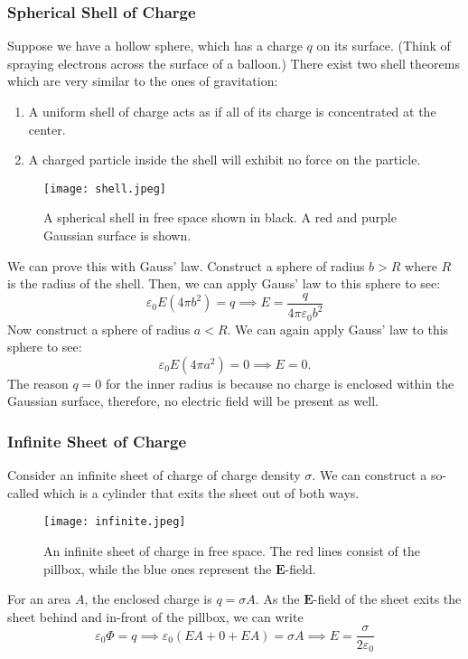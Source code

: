 \documentclass[12pt]{article}
\let\vec\mathbf
\begin{document}
  \subsubsection{Spherical Shell of Charge}
  Suppose we have a hollow sphere, which has a charge $q$ on its surface. (Think of spraying electrons across the surface of a balloon.) There exist two shell theorems which are very similar to the ones of gravitation:
  \begin{enumerate}
      \item A uniform shell of charge acts as if all of its charge is concentrated at the center.
      \item A charged particle inside the shell will exhibit no force on the particle. 
  \end{enumerate}
  \begin{figure}[H]
  \centering
      \texttt{[image: shell.jpeg]}
      \caption{A spherical shell in free space shown in black. A red and purple Gaussian surface is shown. }
  \end{figure}
  We can prove this with Gauss' law. Construct a sphere of radius $b > R$ where $R$ is the radius of the shell. Then, we can apply Gauss' law to this sphere to see:
  \[\varepsilon_0 E(4\pi b^2) = q\implies E = \frac{q}{4\pi \varepsilon_0 b^2}\]
  Now construct a sphere of radius $a < R$. We can again apply Gauss' law to this sphere to see:
  \[\varepsilon_0 E(4\pi a^2) = 0\implies E = 0.\]
  The reason $q = 0$ for the inner radius is because no charge is enclosed within the Gaussian surface, therefore, no electric field will be present as well. 
  \subsubsection{Infinite Sheet of Charge}
  Consider an infinite sheet of charge of charge density $\sigma$. We can construct a so-called  which is a cylinder that exits the sheet out of both ways. 
  \begin{figure}[H]
  \centering
      \texttt{[image: infinite.jpeg]}
      \caption{An infinite sheet of charge in free space. The red lines consist of the pillbox, while the blue ones represent the $\vec E$-field.}
  \end{figure}
  For an area $A$, the enclosed charge is $q = \sigma A$. As the $\vec E$-field of the sheet exits the sheet behind and in-front of the pillbox, we can write 
  \[\varepsilon_0 \Phi = q\implies \varepsilon_0 (EA + 0 + EA) = \sigma A\implies E = \frac{\sigma}{2\varepsilon_0}\]
\end{document}
